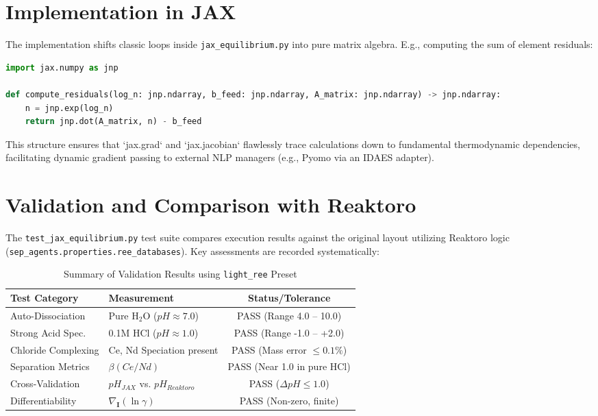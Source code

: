 \documentclass[11pt,a4paper]{article}
\begin{document}
\section{Implementation in JAX}

The implementation shifts classic loops inside \texttt{jax\_equilibrium.py} into pure matrix algebra. E.g., computing the sum of element residuals:
\begin{lstlisting}[language=Python]
import jax.numpy as jnp

def compute_residuals(log_n: jnp.ndarray, b_feed: jnp.ndarray, A_matrix: jnp.ndarray) -> jnp.ndarray:
    n = jnp.exp(log_n)
    return jnp.dot(A_matrix, n) - b_feed
\end{lstlisting}

This structure ensures that `jax.grad` and `jax.jacobian` flawlessly trace calculations down to fundamental thermodynamic dependencies, facilitating dynamic gradient passing to external NLP managers (e.g., Pyomo via an IDAES adapter).

\section{Validation and Comparison with Reaktoro}

The \texttt{test\_jax\_equilibrium.py} test suite compares execution results against the original layout utilizing Reaktoro logic (\texttt{sep\_agents.properties.ree\_databases}). Key assessments are recorded systematically:

\begin{table}[h]
    \centering
    \caption{Summary of Validation Results using \texttt{light\_ree} Preset}
    \begin{tabular}{llc}
        \toprule
        \textbf{Test Category} & \textbf{Measurement} & \textbf{Status/Tolerance} \\ 
        \midrule
        Auto-Dissociation & Pure H$_2$O ($pH \approx 7.0$) & PASS (Range 4.0 -- 10.0) \\
        Strong Acid Spec. & 0.1M HCl ($pH \approx 1.0$) & PASS (Range -1.0 -- +2.0) \\
        Chloride Complexing & Ce, Nd Speciation present & PASS (Mass error $\le 0.1\%$) \\
        Separation Metrics & $\beta(Ce/Nd)$ & PASS (Near 1.0 in pure HCl) \\
        Cross-Validation & $pH_{JAX}$ vs. $pH_{Reaktoro}$ & PASS ($\Delta pH \le 1.0$) \\
        Differentiability & $\nabla_{\mathbf{I}} (\ln \gamma)$ & PASS (Non-zero, finite) \\
        \bottomrule
    \end{tabular}
\end{table}
\end{document}
